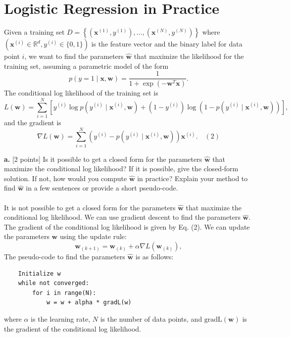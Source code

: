 \documentclass[a3paper,12pt]{extarticle} %
\begin{document}
\section{Logistic Regression in Practice}
Given a training set \( D = \left\{ \left( \mathbf{x}^{(1)}, y^{(1)} \right), \dots, \left( \mathbf{x}^{(N)}, y^{(N)} \right) \right\} \) where \( \left( \mathbf{x}^{(i)} \in \mathbb{R}^d, y^{(i)} \in \{0, 1\} \right) \) is the feature vector and the binary label for data point \( i \), we want to find the parameters \( \hat{\mathbf{w}} \) that maximize the likelihood for the training set, assuming a parametric model of the form
\[
p(y = 1 \mid \mathbf{x}, \mathbf{w}) = \frac{1}{1 + \exp(-\mathbf{w}^T \mathbf{x})}.
\]
The conditional log likelihood of the training set is
\[
L(\mathbf{w}) = \sum_{i=1}^N \left[ y^{(i)} \log p\left( y^{(i)} \mid \mathbf{x}^{(i)}, \mathbf{w} \right) + \left( 1 - y^{(i)} \right) \log \left( 1 - p\left( y^{(i)} \mid \mathbf{x}^{(i)}, \mathbf{w} \right) \right) \right],
\]
and the gradient is
\[
\nabla L(\mathbf{w}) = \sum_{i=1}^N \left( y^{(i)} - p\left( y^{(i)} \mid \mathbf{x}^{(i)}, \mathbf{w} \right) \right) \mathbf{x}^{(i)}. \quad (2)
\]

\noindent \textbf{a.} [2 points] Is it possible to get a closed form for the parameters \( \hat{\mathbf{w}} \) that maximize the conditional log likelihood? If it is possible, give the closed-form solution. If not, how would you compute \( \hat{\mathbf{w}} \) in practice? Explain your method to find \( \hat{\mathbf{w}} \) in a few sentences or provide a short pseudo-code.
\\\\ It is not possible to get a closed form for the parameters \( \hat{\mathbf{w}} \) that maximize the conditional log likelihood. We can use gradient descent to find the parameters \( \hat{\mathbf{w}} \). The gradient of the conditional log likelihood is given by Eq. (2). We can update the parameters \( \mathbf{w} \) using the update rule:
\[
\mathbf{w}_{(k+1)} = \mathbf{w}_{(k)} + \alpha \nabla L(\mathbf{w}_{(k)}),
\]
The  pseudo-code to find the parameters \( \hat{\mathbf{w}} \) is as follows:
\begin{lstlisting}
    Initialize w
    while not converged:
        for i in range(N):
            w = w + alpha * gradL(w)
\end{lstlisting}
where \( \alpha \) is the learning rate, \( N \) is the number of data points, and \( \text{gradL}(\mathbf{w}) \) is the gradient of the conditional log likelihood.\\
\end{document}
